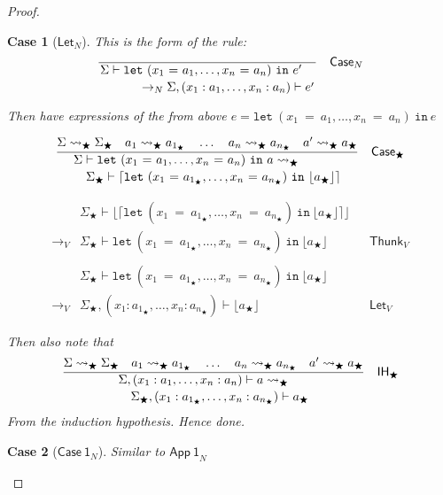 \documentclass[float=false, crop=false]{standalone}
\newtheorem{case}{Case}
\numberwithin{subcase}{case}
\newcommand{\tlang}{\bigstar}
\newcommand{\thunk}[1]{\lceil #1 \rceil}
\newcommand{\unwrap}[1]{\lfloor #1 \rfloor}
\newcommand{\tcbn}{\rightarrow_N}
\newcommand{\tcbv}{\rightarrow_V}
\newcommand{\tlthunk}{\rightsquigarrow_\tlang}
\begin{document}
\begin{proof}
\begin{case}[$\mathsf{Let}_N$]
    This is the form of the rule:
    \[
  \dfrac{}{\splitdfrac{\Sigma \vdash \mathtt{let}\ 
      (x_1\ \mathtt{=}\ a_1,\dotsc, x_n\ \mathtt{=}\ a_n)\ \mathtt{in}\ e'}
    {\tcbn \Sigma,(x_1:a_1,\dotsc,x_n:a_n) \vdash e'}} \quad \mathsf{Case}_N\]

  Then have expressions of the from above 
  $e = \mathtt{let}\ (x_1\ \mathtt{=}\ a_1,\dotsc, x_n\ \mathtt{=}\ a_n)\ \mathtt{in}\ e$
  
\[\dfrac{\Sigma \tlthunk \Sigma_\tlang \quad a_1  \tlthunk a_{1_\tlang} 
    \quad \dots \quad a_n \tlthunk a_{n_\tlang} \quad a' \tlthunk a_\tlang}
  {\splitdfrac{\Sigma \vdash \mathtt{let}\ (x_1\ \mathtt{=}\ a_1,\dotsc, 
      x_n\ \mathtt{=}\ a_n)\ \mathtt{in}\ a \tlthunk}
    {\Sigma_\tlang \vdash \thunk{\mathtt{let}\ 
        (x_1\ \mathtt{=}\ a_{1_\tlang},\dotsc, x_n\ \mathtt{=}\ a_{n_\tlang})
        \ \mathtt{in}\ \unwrap{a_\tlang}}}} \quad \mathsf{Case}_\tlang\]

\begin{align*} 
  & \Sigma_\tlang \vdash \unwrap{\thunk{\mathtt{let}\ 
        (x_1\ \mathtt{=}\ a_{1_\tlang},\dotsc, x_n\ \mathtt{=}\ a_{n_\tlang})
        \ \mathtt{in}\ \unwrap{a_\tlang}}}\\ \tcbv &\Sigma_\tlang \vdash
    \mathtt{let}\ (x_1\ \mathtt{=}\ a_{1_\tlang},
    \dotsc, x_n\ \mathtt{=}\ a_{n_\tlang})
    \ \mathtt{in}\ \unwrap{a_\tlang} && \mathsf{Thunk}_V \\ \\
  & \Sigma_\tlang \vdash \mathtt{let}\ 
    (x_1\ \mathtt{=}\ a_{1_\tlang},\dotsc, x_n\ \mathtt{=}\ a_{n_\tlang})
    \ \mathtt{in}\ \unwrap{a_\tlang}\\ \tcbv &\Sigma_\tlang,
    (x_1:a_{1_\tlang},\dotsc,x_n:a_{n_\tlang}) \vdash 
    \unwrap{a_\tlang} && \mathsf{Let}_V
\end{align*}

Then also note that 
\[
  \dfrac{\Sigma \tlthunk \Sigma_\tlang \quad a_1  
    \tlthunk a_{1_\tlang} \quad \dots \quad a_n 
    \tlthunk a_{n_\tlang} \quad a' \tlthunk a_\tlang}
  {\splitdfrac{\Sigma,(x_1:a_1,\dotsc,x_n:a_n) \vdash a \tlthunk}
   {\Sigma_\tlang,(x_1:a_{1_\tlang},\dotsc,x_n:a_{n_\tlang}) \vdash a_\tlang} }
    \quad \mathsf{IH}_\tlang\] From the induction hypothesis.
    Hence done.
\end{case}

\begin{case}[$\mathsf{Case\ 1}_N$]
Similar to $\mathsf{App\ 1}_N$
\end{case}


\end{proof}
\end{document}
